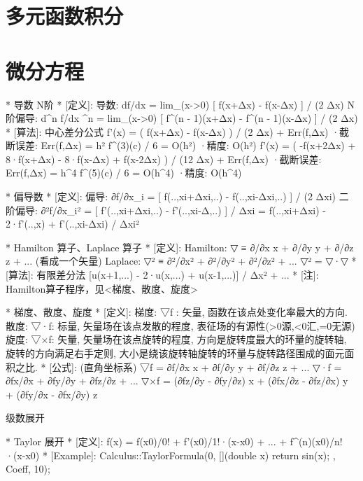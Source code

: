 \documentclass{article}
\begin{document}
    	\section{多元函数积分}
		
\section{微分方程}



    *                    导数  N阶
    *	[定义]:
            导数: df/dx = lim_(x->0)  [ f(x+Δx) - f(x-Δx) ] / (2 Δx)
            N阶偏导:
                  d^n f/dx ^n = lim_(x->0)  [ f^(n - 1)(x+Δx) - f^(n - 1)(x-Δx) ] / (2 Δx)
    *	[算法]: 中心差分公式
            f'(x) = ( f(x+Δx) -  f(x-Δx) ) / (2 Δx) + Err(f,Δx)
            ·截断误差: Err(f,Δx) = h² f^(3)(c) / 6 = O(h²)
            ·精度: O(h²)
            f'(x) = ( -f(x+2Δx) + 8·f(x+Δx) - 8·f(x-Δx) + f(x-2Δx) ) / (12 Δx) + Err(f,Δx)
            ·截断误差: Err(f,Δx) = h^4 f^(5)(c) / 6 = O(h^4)
            ·精度: O(h^4)


*                    偏导数
*	[定义]:
		偏导: ∂f/∂x_i = [ f(..,xi+Δxi,..) -  f(..,xi-Δxi,..) ] / (2 Δxi)
		二阶偏导:
			∂²f/∂x_i² = [ f'(..,xi+Δxi,..) -  f'(..,xi-Δ,..) ] / Δxi
					  = f(..,xi+Δxi) - 2·f'(..,x) + f'(..,xi-Δxi) / Δxi²



*                    Hamilton 算子、Laplace 算子
*	[定义]: 
		Hamilton: ▽  ≡ ∂/∂x \vec x + ∂/∂y \vec y + ∂/∂z \vec z + ... (看成一个矢量)
		Laplace:  ▽² ≡ ∂²/∂x² + ∂²/∂y² + ∂²/∂z² + ...
		▽² = ▽·▽
*	[算法]: 有限差分法
		[u(x+1,...) - 2·u(x,...) + u(x-1,...)] / Δx² + ...
*	[注]: Hamilton算子程序，见<梯度、散度、旋度>                      
       


*                    梯度、散度、旋度
*	[定义]:
		梯度: ▽f		: 矢量, 函数在该点处变化率最大的方向.
		散度: ▽·\vec f: 标量, 矢量场在该点发散的程度, 表征场的有源性(>0源,<0汇,=0无源)
		旋度: ▽×\vec f: 矢量, 矢量场在该点旋转的程度, 
							方向是旋转度最大的环量的旋转轴, 旋转的方向满足右手定则,
							大小是绕该旋转轴旋转的环量与旋转路径围成的面元面积之比.
*	[公式]: (直角坐标系)
		▽f        = ∂f/∂x \vec x + ∂f/∂y \vec y + ∂f/∂z \vec z + ...
		▽·\vec f =  ∂fx/∂x + ∂fy/∂y + ∂fz/∂z + ...
		▽×\vec f = (∂fz/∂y - ∂fy/∂z) \vec x
				   + (∂fx/∂z - ∂fz/∂x) \vec y
				   + (∂fy/∂x - ∂fx/∂y) \vec z


级数展开


*                    Taylor 展开
*	[定义]: 
		f(x) = f(x0)/0! + f'(x0)/1!·(x-x0) + ... + f^(n)(x0)/n!·(x-x0)
*	[Example]:
		Calculus::TaylorFormula(0, [](double x) { return sin(x); }, Coeff, 10);
\end{document}
